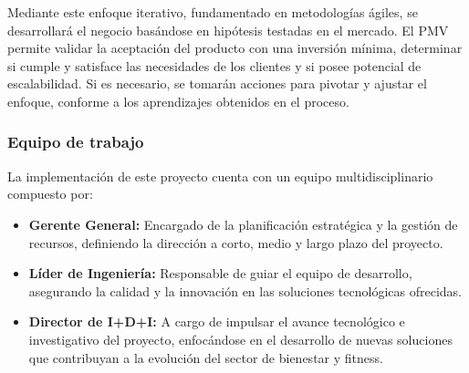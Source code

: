 {Mediante este enfoque iterativo, fundamentado en metodologías ágiles, se desarrollará el negocio basándose en hipótesis testadas en el mercado. El PMV permite validar la aceptación del producto con una inversión mínima, determinar si cumple y satisface las necesidades de los clientes y si posee potencial de escalabilidad. Si es necesario, se tomarán acciones para pivotar y ajustar el enfoque, conforme a los aprendizajes obtenidos en el proceso.

\subsubsection*{Equipo de trabajo}
La implementación de este proyecto cuenta con un equipo multidisciplinario compuesto por:

\begin{itemize}
    \item \textbf{Gerente General:} Encargado de la planificación estratégica y la gestión de recursos, definiendo la dirección a corto, medio y largo plazo del proyecto.
    
    \item \textbf{Líder de Ingeniería:} Responsable de guiar el equipo de desarrollo, asegurando la calidad y la innovación en las soluciones tecnológicas ofrecidas.
    
    \item \textbf{Director de I+D+I:} A cargo de impulsar el avance tecnológico e investigativo del proyecto, enfocándose en el desarrollo de nuevas soluciones que contribuyan a la evolución del sector de bienestar y fitness.
\end{itemize}

\begin{adjustbox}{
            center,
            caption=[{Equipo de trabajo.}]{Equipo de trabajo. },
            label={EquipoDeTrabajo},
            nofloat=table, vspace={20px}}
    \end{adjustbox}
    }